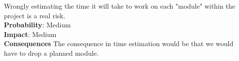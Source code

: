 Wrongly estimating the time it will take to work on each "module" within the project is a real risk.\\
\textbf{Probability}: Medium\\
\textbf{Impact}: Medium\\
\textbf{Consequences}
The consequence in time estimation would be that we would have to drop a planned module.